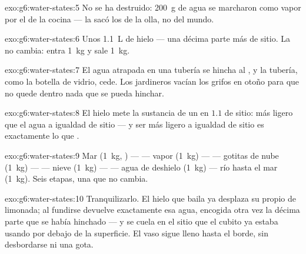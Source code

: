 \begin{solution}{exo:g6:water-states:5}
No se ha destruido: \qty{200}{g} de agua se marcharon como vapor por
el  de la cocina --- la  sacó los  de la
olla, no del mundo.
\end{solution}

\begin{solution}{exo:g6:water-states:6}
Unos \qty{1.1}{L} de hielo --- una décima parte más de sitio. La
 no cambia: entra \qty{1}{kg} y sale \qty{1}{kg}.
\end{solution}

\begin{solution}{exo:g6:water-states:7}
El agua atrapada en una tubería se hincha al , y la
tubería, como la botella de vidrio, cede. Los jardineros vacían los
grifos en otoño para que no quede dentro nada que se pueda hinchar.
\end{solution}

\begin{solution}{exo:g6:water-states:8}
El hielo mete la sustancia de un  en $1.1$  de sitio:
más ligero que el agua a igualdad de sitio --- y ser más ligero a
igualdad de sitio es exactamente lo que .
\end{solution}

\begin{solution}{exo:g6:water-states:9}
Mar (\qty{1}{kg}, ) ---  --- vapor
(\qty{1}{kg}) ---  --- gotitas de nube (\qty{1}{kg})
---  --- nieve (\qty{1}{kg}) ---  --- agua
de deshielo (\qty{1}{kg}) --- río hasta el mar (\qty{1}{kg}). Seis
etapas, una  que no cambia.
\end{solution}

\begin{solution}{exo:g6:water-states:10}
Tranquilizarlo. El hielo que baila ya desplaza su propio
\emph{} de limonada; al fundirse devuelve exactamente esa
agua, encogida otra vez la décima parte que se había hinchado --- y se
cuela en el sitio que el cubito ya estaba usando por debajo de la
superficie. El vaso sigue lleno hasta el borde, sin desbordarse ni una
gota.
\end{solution}

